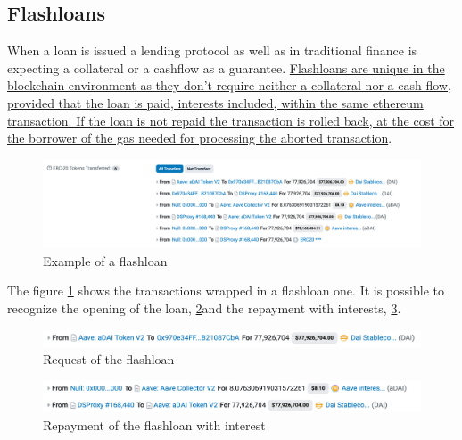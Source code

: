 \documentclass[11pt,a4paper,titlepage]{scrartcl}
\begin{document}
\subsection {Flashloans}

When a loan is issued a lending protocol as well as in traditional finance is expecting a collateral or a cashflow as a guarantee. \uline{Flashloans are unique in the blockchain environment as they don't require neither a collateral nor a cash flow, provided that the loan is paid, interests included, within the same ethereum transaction. If the loan is not repaid the transaction is rolled back, at the cost for the borrower of the gas needed for processing the aborted transaction}. 
\begin{figure}[ht]
    \includegraphics[width=1\textwidth]{image/flashloan.png}
    \caption{Example of a  flashloan}
    \label{fig:etherscanFLoan}
\end{figure}

The figure \ref{fig:etherscanFLoan} shows the transactions wrapped in a flashloan one. It is possible to recognize the opening of the loan, \ref{fig:etherscanreqFLoan}and the repayment with interests,  \ref{fig:etherscanrepFLoan}.

\begin{figure}[H]
    \includegraphics[width=1\textwidth]{image/requestFlashloan.png}
    \caption{Request of the  flashloan}
    \label{fig:etherscanreqFLoan}
\end{figure}

\begin{figure}[H]
    \includegraphics[width=1\textwidth]{image/repayFlashloan.png}
    \caption{Repayment of the  flashloan with interest}
    \label{fig:etherscanrepFLoan}
\end{figure}
\end{document}
